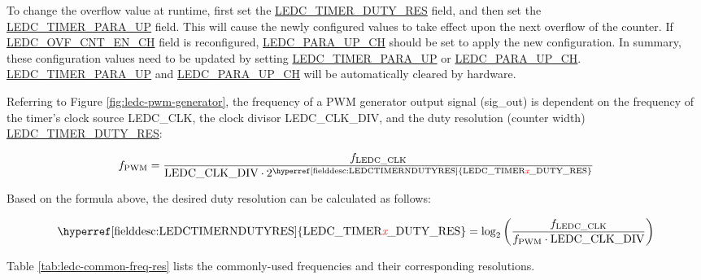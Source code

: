 \documentclass[main\_\_EN.tex]{subfiles}
\begin{document}
To change the overflow value at runtime, first set the \hyperref[fielddesc:LEDCTIMERNDUTYRES]{LEDC\_TIMER\_DUTY\_RES} field, and then set the\\ \hyperref[fielddesc:LEDCTIMERNPARAUP]{LEDC\_TIMER\_PARA\_UP} field. This will cause the newly configured values to take effect upon the next overflow of the counter. If \hyperref[fielddesc:LEDCOVFCNTENCHN]{LEDC\_OVF\_CNT\_EN\_CH} field is reconfigured, \hyperref[fielddesc:LEDCPARAUPCHN]{LEDC\_PARA\_UP\_CH} should be set to apply the new configuration. In summary, these configuration values need to be updated by setting \hyperref[fielddesc:LEDCTIMERNPARAUP]{LEDC\_TIMER\_PARA\_UP} or \hyperref[fielddesc:LEDCPARAUPCHN]{LEDC\_PARA\_UP\_CH}. \hyperref[fielddesc:LEDCTIMERNPARAUP]{LEDC\_TIMER\_PARA\_UP} and \hyperref[fielddesc:LEDCPARAUPCHN]{LEDC\_PARA\_UP\_CH} will be automatically cleared by hardware.

Referring to Figure \ref{fig:ledc-pwm-generator}, the frequency of a PWM generator output signal (sig\_out) is dependent on the frequency of the timer's clock source LEDC\_CLK, the clock divisor LEDC\_CLK\_DIV, and the duty resolution (counter width) \hyperref[fielddesc:LEDCTIMERNDUTYRES]{LEDC\_TIMER\_DUTY\_RES}:

    \[
    f_{\textrm{PWM}}=\frac{f_{\textrm{LEDC\_CLK}}}
                        {\textrm{LEDC\_CLK\_DIV}\cdot 2^{\textrm{\hyperref[fielddesc:LEDCTIMERNDUTYRES]{LEDC\_TIMER\regindex{x}\_DUTY\_RES}}}}
    \]

Based on the formula above, the desired duty resolution can be calculated as follows:

    \[
    \textrm{\hyperref[fielddesc:LEDCTIMERNDUTYRES]{LEDC\_TIMER\regindex{x}\_DUTY\_RES}}
    =\log_2\left(\frac{f_{\textrm{LEDC\_CLK}}}
    {f_{\textrm{PWM}}\cdot \textrm{LEDC\_CLK\_DIV}}\right)
    \]


Table \ref{tab:ledc-common-freq-res} lists the commonly-used frequencies and their corresponding resolutions.
\end{document}
